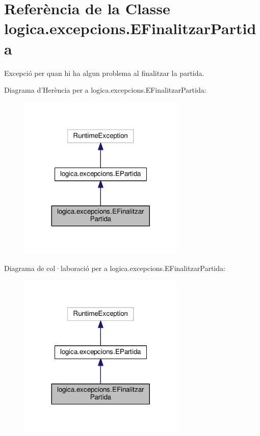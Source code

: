 \hypertarget{classlogica_1_1excepcions_1_1_e_finalitzar_partida}{\section{Referència de la Classe logica.\+excepcions.\+E\+Finalitzar\+Partida}
\label{classlogica_1_1excepcions_1_1_e_finalitzar_partida}
}


Excepció per quan hi ha algun problema al finalitzar la partida.  




Diagrama d'Herència per a logica.\+excepcions.\+E\+Finalitzar\+Partida\+:\nopagebreak
\begin{figure}[H]
\begin{center}
\leavevmode
\includegraphics[width=224pt]{classlogica_1_1excepcions_1_1_e_finalitzar_partida__inherit__graph}
\end{center}
\end{figure}


Diagrama de col·laboració per a logica.\+excepcions.\+E\+Finalitzar\+Partida\+:\nopagebreak
\begin{figure}[H]
\begin{center}
\leavevmode
\includegraphics[width=224pt]{classlogica_1_1excepcions_1_1_e_finalitzar_partida__coll__graph}
\end{center}
\end{figure}
